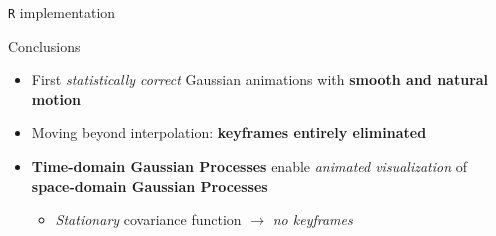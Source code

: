 \documentclass[final,t]{beamer}\usepackage[]{graphicx}\usepackage[]{color}
\begin{document}
\begin{frame}[fragile]
\begin{columns}[T,onlytextwidth]
\begin{column}{.325\linewidth}
\begin{block}{\texttt{R} implementation}
      \end{block}

      \begin{block}{Conclusions}
        \begin{itemize}
          \item First \textit{statistically correct} Gaussian animations with
            \textbf{smooth and natural motion}
          \item Moving beyond interpolation: \textbf{keyframes entirely
            eliminated}
          \item \textbf{Time-domain Gaussian Processes} enable \textit{animated
            visualization} of \textbf{space-domain Gaussian Processes}
            \begin{itemize}
              \item \textit{Stationary} covariance function $\rightarrow$
                \textit{no keyframes}
            \end{itemize}
        \end{itemize}
      \end{block}

    \end{column}

  \end{columns}


\end{frame}
\end{document}
